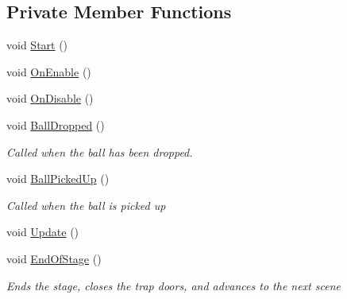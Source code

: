 \subsection*{Private Member Functions}
\begin{DoxyCompactItemize}
\item 
void \mbox{\hyperlink{class_stage4_a24aafa249875c3bd1a1383d2eb40c79e}{Start}} ()
\item 
void \mbox{\hyperlink{class_stage4_ace16b39395d5c08775c8e031c0e76aa2}{On\+Enable}} ()
\item 
void \mbox{\hyperlink{class_stage4_a2746354b2a72b27e3add3f0f4c7f5160}{On\+Disable}} ()
\item 
void \mbox{\hyperlink{class_stage4_a32fad5731207055e6b5630a59076dcfd}{Ball\+Dropped}} ()
\begin{DoxyCompactList}\small\item\em Called when the ball has been dropped. \end{DoxyCompactList}\item 
void \mbox{\hyperlink{class_stage4_aeb84711e7a42d39c057d74c7d7a1fe17}{Ball\+Picked\+Up}} ()
\begin{DoxyCompactList}\small\item\em Called when the ball is picked up \end{DoxyCompactList}\item 
void \mbox{\hyperlink{class_stage4_a6772bbc4255878e6c0987c8876e547b7}{Update}} ()
\item 
void \mbox{\hyperlink{class_stage4_a972d03f467d6ce6fd2de56b541b85a3b}{End\+Of\+Stage}} ()
\begin{DoxyCompactList}\small\item\em Ends the stage, closes the trap doors, and advances to the next scene \end{DoxyCompactList}\end{DoxyCompactItemize}
